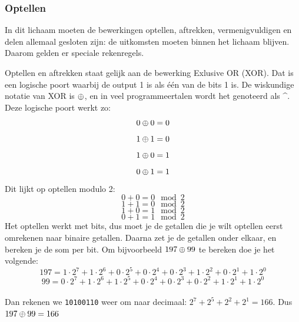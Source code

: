 \documentclass{article}
\begin{document}
\subsubsection*{Optellen}
In dit lichaam moeten de bewerkingen optellen, aftrekken, vermenigvuldigen en delen allemaal gesloten zijn: de uitkomsten moeten binnen het lichaam blijven. Daarom gelden er speciale rekenregels.\par
Optellen en aftrekken staat gelijk aan de bewerking Exlusive OR (XOR). Dat is een logische poort waarbij de output 1 is als één van de bits 1 is. De wiskundige notatie van XOR is $\mathbin{\oplus}$, en in veel programmeertalen wordt het genoteerd als ^. Deze logische poort werkt zo:
$$0\mathbin{\oplus}0=0$$
$$1\mathbin{\oplus}1=0$$
$$1\mathbin{\oplus}0=1$$
$$0\mathbin{\oplus}1=1$$
Dit lijkt op optellen modulo 2:
$$0+0=0\mod{2}$$
$$1+1=0\mod{2}$$
$$1+0=1\mod{2}$$
$$0+1=1\mod{2}$$
Het optellen werkt met bits, dus moet je de getallen die je wilt optellen eerst omrekenen naar binaire getallen. Daarna zet je de getallen onder elkaar, en bereken je de som per bit. Om bijvoorbeeld $197 \mathbin{\oplus} 99$ te bereken doe je het volgende:
$$197 = 1\cdot2^7 + 1\cdot2^6 + 0\cdot2^5 + 0\cdot2^4 + 0\cdot2^3+ 1\cdot2^2 + 0\cdot2^1 + 1\cdot2^0$$
$$99 = 0\cdot2^7 + 1\cdot2^6 + 1\cdot2^5 + 0\cdot2^4 + 0\cdot2^3+ 0\cdot2^2 + 1\cdot2^1 + 1\cdot2^0$$
\\
Dan rekenen we \texttt{10100110} weer om naar decimaal: $2^7+2^5+2^2+2^1=166$. Dus $197 \mathbin{\oplus} 99 = 166$
\end{document}

